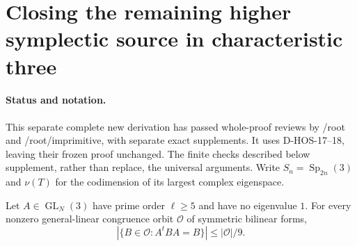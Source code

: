 \section{Closing the remaining higher symplectic source in characteristic three}
\label{sec:symplectic-three-semisimple}

\paragraph{Status and notation.}
This separate complete new derivation has passed whole-proof reviews
by /root and /root/imprimitive, with separate exact supplements. It uses D-HOS-17--18, leaving their frozen proof
unchanged. The finite checks described below supplement, rather than
replace, the universal arguments. Write $S_n=\operatorname{Sp}_{2n}(3)$
and $\nu(T)$ for the codimension of its largest complex eigenspace.

\begin{lemma}
\label{D-HOS-20}
Let $A\in\operatorname{GL}_{N}(3)$ have prime order $\ell\ge5$
and have no eigenvalue $1$. For every nonzero general-linear
congruence orbit $\mathcal O$ of symmetric bilinear forms,
\[
             |\{B\in\mathcal O:A^tBA=B\}|\le|\mathcal O|/9.
                                                               \tag{HOS3P.1}
\]
\end{lemma}

